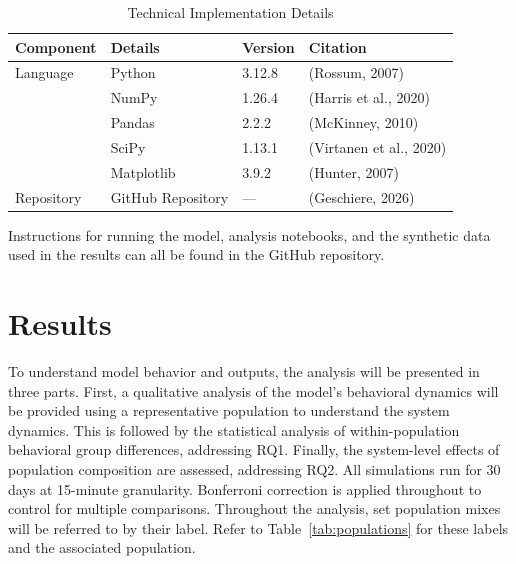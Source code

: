\documentclass[11pt, a4paper]{article}
\begin{document}
\begin{table}[h]
\centering
\begin{tabular}{llll}
\toprule
Component & Details & Version & Citation \\
\midrule
Language & Python & 3.12.8 & (Rossum, 2007) \\
\addlinespace
\multirow{4}{*}{Packages} & NumPy & 1.26.4 & (Harris et al., 2020) \\
                          & Pandas & 2.2.2 & (McKinney, 2010) \\
                          & SciPy & 1.13.1 & (Virtanen et al., 2020) \\
                          & Matplotlib & 3.9.2 & (Hunter, 2007) \\
\addlinespace
Repository & GitHub Repository & --- & (Geschiere, 2026) \\
\bottomrule
\end{tabular}
\caption{Technical Implementation Details}
\label{tab:technical_implementation}
\end{table}
Instructions for running the model, analysis notebooks, and the synthetic data used in the results can all be found in the GitHub repository.

\section{Results}
To understand model behavior and outputs, the analysis will be presented in three parts. First, a qualitative analysis of the model's behavioral dynamics will be provided using a representative population to understand the system dynamics. This is followed by the statistical analysis of within-population behavioral group differences, addressing RQ1. Finally, the system-level effects of population composition are assessed, addressing RQ2. All simulations run for 30 days at 15-minute granularity. Bonferroni correction is applied throughout to control for multiple comparisons.
Throughout the analysis, set population mixes will be referred to by their label. Refer to Table~\ref{tab:populations} for these labels and the associated population.
\end{document}
